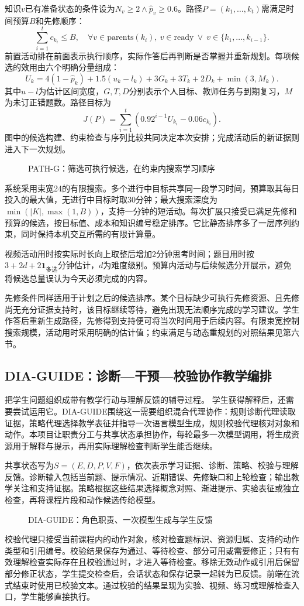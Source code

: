 \documentclass[UTF8,zihao=-4,fontset=none,a4paper]{ctexart}
\newcommand{\diagram}[2]{\par\begin{figure}[htbp]\centering\caption{#2}\end{figure}\par}
\begin{document}
知识$v$已有准备状态的条件设为$N_v\ge2\land \hat p_v\ge0.6$。路径$P=(k_1,\ldots,k_t)$需满足时间预算$B$和先修顺序：
\begin{equation}
\sum_{i=1}^t c_{k_i}\le B,\quad
\forall v\in\mathrm{parents}(k_i),\
v\in\mathrm{ready}\ \lor\ v\in\{k_1,\ldots,k_{i-1}\}.
\end{equation}
前置活动排在前面表示执行顺序，实际作答后再判断是否掌握并重新规划。每项候选的效用由六个明确分量组成：
\begin{equation}
U_k=4(1-\hat p_k)+1.5(u_k-l_k)+3G_k+3T_k+2D_k+\min(3,M_k).
\end{equation}
其中$u-l$为估计区间宽度，$G,T,D$分别表示个人目标、教师任务与到期复习，$M$为未订正错题数。路径目标为
\begin{equation}
J(P)=\sum_{i=1}^{t}\left(0.92^{i-1}U_{k_i}-0.06c_{k_i}\right).
\end{equation}
图中的候选构建、约束检查与序列比较共同决定本次安排；完成活动后的新证据则进入下一次规划。
\diagram{path-search}{PATH-G：筛选可执行候选，在约束内搜索学习顺序}
系统采用束宽24的有限搜索。多个进行中目标共享同一段学习时间，预算取其每日投入的最大值，无进行中目标时取30分钟；最大搜索深度为$\min(|K|,\max(1,B))$，支持一分钟的短活动。每次扩展只接受已满足先修和预算的候选，按目标值、成本和知识编号稳定排序。它比静态排序多了一层序列约束，同时保持本机交互所需的有限计算量。

视频活动用时按实际时长向上取整后增加2分钟思考时间；题目用时按$3+2d+2\mathbf{1}_{\text{多选}}$分钟估计，$d$为难度级别。预算内活动与后续候选分开展示，避免将候选总量误认为今天必须完成的内容。

先修条件同样适用于计划之后的候选排序。某个目标缺少可执行先修资源、且先修尚无充分证据支持时，该目标继续等待，避免出现无法顺序完成的学习建议。学生作答后重新生成路径，先修得到支持便可将当次时间用于后续内容。有限束宽控制搜索规模，活动用时采用明确的估计值；约束满足与动态重规划的对照结果见第六节。

\subsection{DIA-GUIDE：诊断—干预—校验协作教学编排}
\methodDiaGuide{}把学生问题组织成带有教学行动与理解反馈的辅导过程。
学生获得解释后，还需要尝试运用它。DIA-GUIDE围绕这一需要组织混合代理协作：规则诊断代理读取证据，策略代理选择教学表征并指导一次语言模型生成，规则校验代理核对对象和动作。本项目让职责分工与共享状态承担协作，每轮最多一次模型调用，将生成资源用于解释与提示，再用实际理解检查判断学生能否继续。

共享状态写为$S=(E,D,P,V,F)$，依次表示学习证据、诊断、策略、校验与理解反馈。诊断输入包括当前题、提示情况、近期错误、先修缺口和上轮检查；输出教学关注和支持证据。策略根据这些结果选择概念对照、渐进提示、实验表征或独立检查，再将课程片段和动作候选传给模型。
\diagram{actions}{DIA-GUIDE：角色职责、一次模型生成与学生反馈}
校验代理只接受当前课程内的动作对象，核对检查题标识、资源归属、支持的动作类型和引用编号。校验结果保存为通过、等待检查、部分可用或需要修正；只有有效理解检查实际存在且校验通过时，才进入等待检查。移除无效动作或引用后保留部分修正状态，学生提交检查后，会话状态和保存记录一起转为已反馈。前端在流式结束时使用已校验文本。通过校验的结果呈现为实验、视频、练习或理解检查入口，学生能够直接执行。
\end{document}
